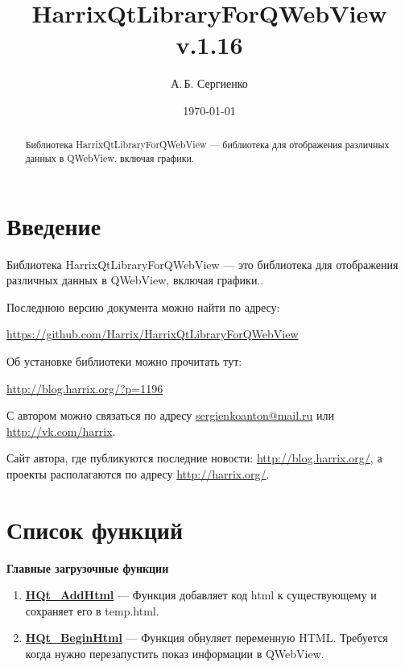\documentclass[a4paper,12pt]{article}
\title{HarrixQtLibraryForQWebView v.1.16}
\author{А.\,Б. Сергиенко}
\date{\today}
\begin{document}


\maketitle

\begin{abstract}
Библиотека HarrixQtLibraryForQWebView --- библиотека для отображения различных данных в QWebView, включая графики.
\end{abstract}

\tableofcontents

\newpage

\section{Введение}

Библиотека HarrixQtLibraryForQWebView --- это библиотека для отображения различных данных в QWebView, включая графики..

Последнюю версию документа можно найти по адресу:

\href{https://github.com/Harrix/HarrixQtLibraryForQWebView}{https://github.com/Harrix/HarrixQtLibraryForQWebView}

Об установке библиотеки можно прочитать тут:

\href{http://blog.harrix.org/?p=1196}{http://blog.harrix.org/?p=1196}

С автором можно связаться по адресу \href{mailto:sergienkoanton@mail.ru}{sergienkoanton@mail.ru} или  \href{http://vk.com/harrix}{http://vk.com/harrix}.

Сайт автора, где публикуются последние новости: \href{http://blog.harrix.org/}{http://blog.harrix.org/}, а проекты располагаются по адресу \href{http://harrix.org/}{http://harrix.org/}.

\newpage
\section{Список функций}\label{section_listfunctions}
\textbf{Главные загрузочные функции}
\begin{enumerate}

\item \textbf{\hyperref[HQt_AddHtml]{HQt\_AddHtml}} --- Функция добавляет код html к существующему и сохраняет его в temp.html.

\item \textbf{\hyperref[HQt_BeginHtml]{HQt\_BeginHtml}} --- Функция обнуляет переменную HTML. Требуется когда нужно перезапустить показ информации в QWebView.

\end{enumerate}
\end{document}
